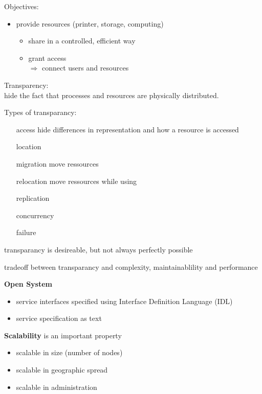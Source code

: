 \documentclass[ngerman,a4paper]{report}
\begin{document}
Objectives:\\
\begin{itemize}
\item provide resources (printer, storage, computing)
\begin{itemize}
\item share in a controlled, efficient way
\item grant access\\
$\Rightarrow$ connect users and resources
\end{itemize}

\end{itemize}

Transparency:\\
hide the fact that processes and resources are physically distributed.

Types of transparancy:\\
\begin{itemize}
\item[access] hide differences in representation and how a resource is accessed
\item[location]
\item[migration] move ressources
\item[relocation] move ressources while using
\item[replication]
\item[concurrency]
\item[failure]
\end{itemize}

transparancy is desireable, but not always perfectly possible

tradeoff between transparancy and complexity, maintainablility and performance

\textbf{Open System}

\begin{itemize}
\item service interfaces specified using Interface Definition Language (IDL)
\item service specification as text
\end{itemize}

\textbf{Scalability} is an important property

\begin{itemize}
\item scalable in size (number of nodes)
\item scalable in geographic spread
\item scalable in administration
\end{itemize}
\end{document}
